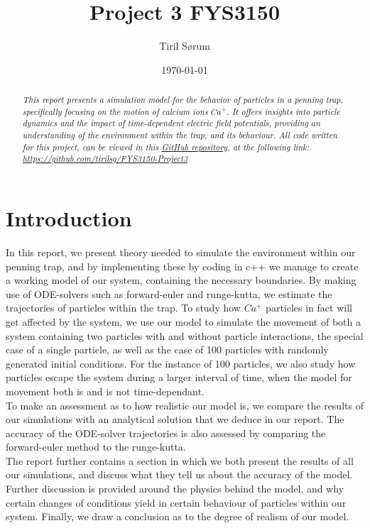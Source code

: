 \documentclass[english,notitlepage,reprint,nofootinbib,twocolumn]{article}
\begin{document}
\title{Project 3 FYS3150} 
\author{Tiril Sørum} 
\date{\today}                             
\maketitle                     

\begin{abstract}
    \textit{This report presents a simulation model for the behavior of particles in a penning trap, specifically focusing on the motion of calcium ions $Ca^+$. It offers insights into particle dynamics and the impact of time-dependent electric field potentials, providing an understanding of the environment within the trap, and its behaviour. All code written for this project, can be viewed in this \href{https://github.com/tirilsg/FYS3150-Project3}{GitHub repository}, at the following link:
  \url{https://github.com/tirilsg/FYS3150-Project3}}
\end{abstract}

\section{Introduction}\label{sec:introduction}

In this report, we present theory needed to simulate the environment within our penning trap, and by implementing these by coding in c++ we manage to create a working model of our system, containing the necessary boundaries. By making use of ODE-solvers such as forward-euler and runge-kutta, we estimate the trajectories of particles within the trap. To study how $Ca^+$ particles in fact will get affected by the system, we use our model to simulate the movement of both a system containing two particles with and without particle interactions, the special case of a single particle, as well as the case of 100 particles with randomly generated initial conditions. For the instance of 100 particles, we also study how particles escape the system during a larger interval of time, when the model for movement both is and is not time-dependant. \\

To make an assessment as to how realistic our model is, we compare the results of our simulations with an analytical solution that we deduce in our report. The accuracy of the ODE-solver trajectories is also assessed by comparing the forward-euler method to the runge-kutta. \\

The report further contains a section in which we both present the results of all our simulations, and discuss what they tell us about the accuracy of the model. Further discussion is provided around the physics behind the model, and why certain changes of conditions yield in certain behaviour of particles within our system. Finally, we draw a conclusion as to the degree of realism of our model. 
\end{document}
